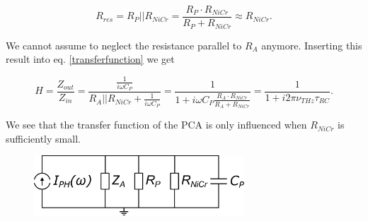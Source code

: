 \begin{equation}
    R_{res} = R_P || R_{NiCr} = \frac{R_P\cdot R_{NiCr}}{R_P + R_{NiCr}} \approx R_{NiCr}.
\end{equation}

We cannot assume to neglect the resistance parallel to $R_A$ anymore. Inserting this result into eq. \ref{transferfunction} we get 

\begin{equation}
    H = \frac{Z_{out}}{Z_{in}} = \frac{\frac{1}{i\omega C_P}}{R_A || R_{NiCr} + \frac{1}{i\omega C_P}} = \frac{1}{1 + i\omega C_P \frac{R_A \cdot R_{NiCr}}{R_A + R_{NiCr}}} = \frac{1}{1 + i 2\pi \nu_{THz} \tau_{RC}}.   
\end{equation}

We see that the transfer function of the PCA is only influenced when $R_{NiCr}$ is sufficiently small. 

\begin{figure}[ht]
    \centering
    \includegraphics[width=0.7\textwidth]{figures/eq_circuit_PCA_wNiCr.pdf}
    \caption{}
    \label{eq_circuit_NiCR}
\end{figure}

